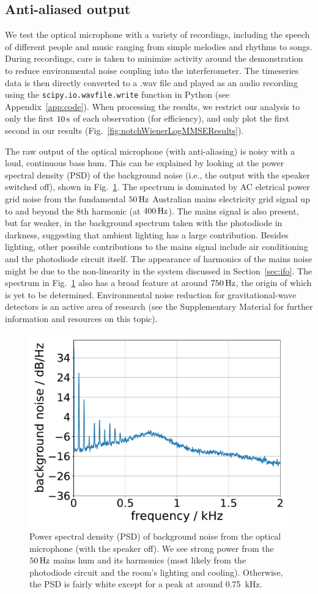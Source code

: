 \documentclass[paper-main.tex]{subfiles}
\begin{document}
\subsection{Anti-aliased output}
\label{sec:initialResultsOpMic}

We test the optical microphone with a variety of recordings, including the speech of different people and music ranging from simple melodies and rhythms to songs. 
During recordings, care is taken to minimize activity around the demonstration to reduce environmental noise coupling into the interferometer. 
The timeseries data is then directly converted to a .wav file and played as an audio recording using the \texttt{scipy.io.wavfile.write} function in Python (see Appendix~\ref{app:code}).
When processing the results, we restrict our analysis to only the first $10\,{\rm s}$ of each observation (for efficiency), and only plot the first second in our results (Fig.~\ref{fig:notchWienerLogMMSEResults}).


The raw output of the optical microphone (with anti-aliasing) is noisy with a loud, continuous bass hum. 
This can be explained by looking at the power spectral density (PSD) of the background noise (i.e., the output with the speaker switched off), shown in Fig.~\ref{fig:psd_noise}. 
The spectrum is dominated by AC eletrical power grid noise from the fundamental $50\,{\rm Hz}$ Australian mains electricity grid signal up to and beyond the $8$th harmonic (at $400\,{\rm Hz}$). 
The mains signal is also present, but far weaker, in the background spectrum taken with the photodiode in darkness, suggesting that ambient lighting has a large contribution. 
Besides lighting, other possible contributions to the mains signal include air conditioning and the photodiode circuit itself. 
The appearance of harmonics of the mains noise might be due to the non-linearity in the system discussed in Section~\ref{sec:ifo}. 
The spectrum in Fig.~\ref{fig:psd_noise} also has a broad feature at around $750\,{\rm Hz}$, the origin of which is yet to be determined.
Environmental noise reduction for gravitational-wave detectors is an active area of research (see the Supplementary Material for further information and resources on this topic).


\begin{figure}
	\includegraphics[width=.5\textwidth]{figures/psd_podo_14_6.pdf}
	\caption{\label{fig:psd_noise}
Power spectral density (PSD) of background noise from the optical microphone (with the speaker off). 
We see strong power from the $50\,{\rm Hz}$ mains hum and its harmonics (most likely from the photodiode circuit and the room’s lighting and cooling). Otherwise, the PSD is fairly white except for a peak at around 0.75~kHz.
}
\end{figure}
\end{document}
